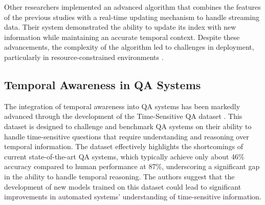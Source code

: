 Other researchers implemented an advanced algorithm that combines the features of the previous studies with a real-time updating mechanism to handle streaming data. Their system demonstrated the ability to update its index with new information while maintaining an accurate temporal context. Despite these advancements, the complexity of the algorithm led to challenges in deployment, particularly in resource-constrained environments \parencite{campos2014survey}.

\subsection{Temporal Awareness in QA Systems}

The integration of temporal awareness into QA systems has been markedly advanced through the development of the Time-Sensitive QA dataset \parencite{chen2021dataset}. This dataset is designed to challenge and benchmark QA systems on their ability to handle time-sensitive questions that require understanding and reasoning over temporal information. The dataset effectively highlights the shortcomings of current state-of-the-art QA systems, which typically achieve only about 46\% accuracy compared to human performance at 87\%, underscoring a significant gap in the ability to handle temporal reasoning. The authors suggest that the development of new models trained on this dataset could lead to significant improvements in automated systems' understanding of time-sensitive information.